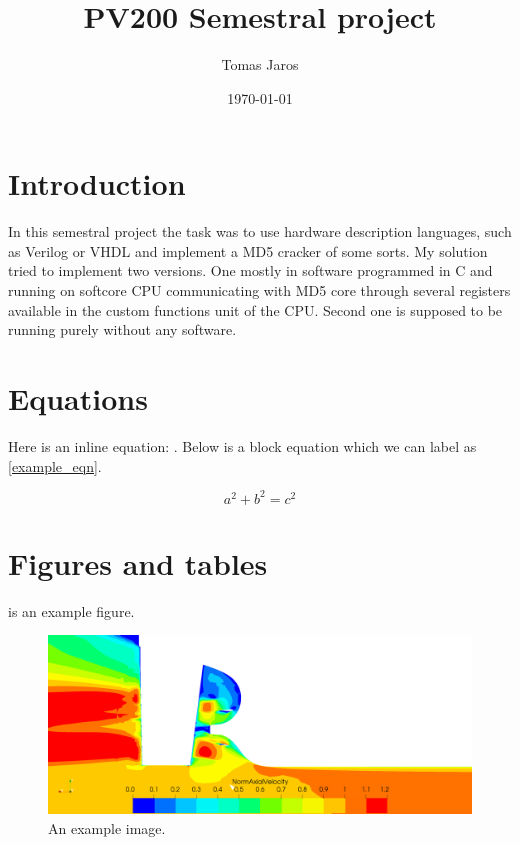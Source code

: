 \documentclass{article}
\title{PV200 Semestral project} %
\author{Tomas Jaros} %
\date{\today} %
\begin{document}

    \maketitle %

    \section{Introduction}
    In this semestral project the task was to use hardware description languages, such as Verilog or VHDL and implement a MD5
    cracker of some sorts. My solution tried to implement two versions. One mostly in software programmed in C and running on
    softcore CPU communicating with MD5 core through several registers available in the custom functions unit of the CPU.
    Second one is supposed to be running purely without any software.


    \section{Equations}
    Here is an inline equation: . Below is a block equation which we can label as \eqref{example_eqn}.

    \begin{equation}
        \label{example_eqn}
        a^2+b^2=c^2
    \end{equation}

    \section{Figures and tables}
     is an example figure.

    \begin{figure}[h!]
        \includegraphics[width=\linewidth]{images/example.png}
        \caption{An example image.}
        \label{figtest}
    \end{figure}
\end{document}
